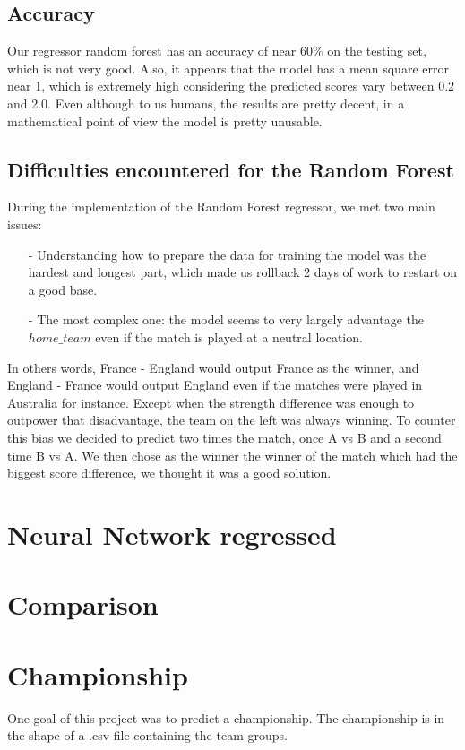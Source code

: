 \subsection{Accuracy}
Our regressor random forest has an accuracy of near 60\% on the testing set, which is not very good.
Also, it appears that the model has a mean square error near 1, which is extremely high considering the predicted scores vary between 0.2 and 2.0.
Even although to us humans, the results are pretty decent, in a mathematical point of view the model is pretty unusable.
\subsection{Difficulties encountered for the Random Forest}
During the implementation of the Random Forest regressor, we met two main issues:
 \begin{itemize}
    \item[-] Understanding how to prepare the data for training the model was the hardest and longest part, which made us rollback 2 days of work to restart on a good base.
    \item[-] The most complex one: the model seems to very largely advantage the $home\_team$ even if the match is played at a neutral location.

\end{itemize}
	In others words, France - England would output France as the winner, and England - France would output England even if the matches were played in Australia for instance.
	Except when the strength difference was enough to outpower that disadvantage, the team on the left was always winning.
	To counter this bias we decided to predict two times the match, once A vs B and a second time B vs A. We then chose as the winner the winner of the match which had the biggest score difference, we thought it was a good solution.
\newpage
\section{Neural Network regressed}
\section{Comparison}
\section{Championship}
One goal of this project was to predict a championship.
The championship is in the shape of a .csv file containing the team groups.

